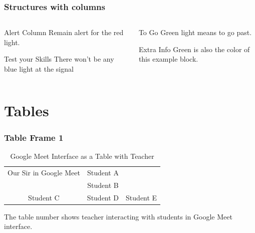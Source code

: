 \documentclass{beamer}
\begin{document}
\begin{frame}
\frametitle{Structures with columns}
\begin{columns}
    \begin{column}{0.40\textwidth}
        \begin{alertblock}{Alert Column}
            Remain alert for the red light.
        \end{alertblock}
        \pause
        \begin{block}{ Test your Skills}
            There won't be any blue light at the signal
        \end{block}
        \pause
    \end{column}
    \begin{column}{0.40\textwidth}
        \begin{exampleblock}{To Go}
            Green light means to go past.
        \end{exampleblock}{}
        \pause
        \begin{exampleblock}{Extra Info}
            Green is also the color of this example block.
        \end{exampleblock}{}
            
    \end{column}
\end{columns}
     
\end{frame}

\section{Tables}
\begin{frame}
\frametitle{Table Frame 1}
\begin{table}[]
    \centering
    \begin{tabular}{ccc}
        \hline
        Our Sir in Google Meet & Student A & \\
        \pause
        & Student B & \pause \\ \hline
        Student C & Student D & Student E \\ \hline
    \end{tabular}
    \caption{Google Meet Interface as a Table with Teacher}
\end{table}

The table number shows teacher interacting with students in
Google Meet interface.
\end{frame}
\end{document}
